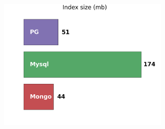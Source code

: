 \documentclass[18pt, compress, aspectratio=169]{beamer}
\begin{document}
\begin{frame}
    \frametitle{}
    \begin{center}
    \begin{figure}
        \includegraphics[width=0.75\textwidth,center]{benchmarks/index_size.png}
    \end{figure}
    \end{center}
\end{frame}



\end{document}
